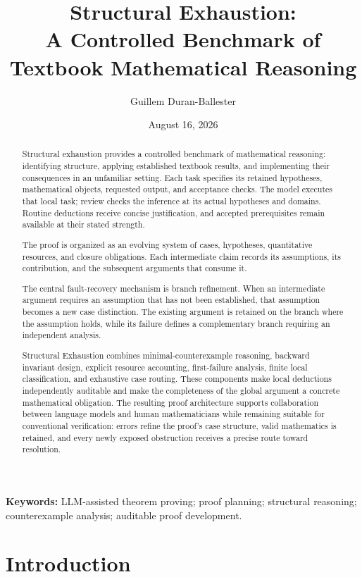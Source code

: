\documentclass[11pt]{article}
\title{Structural Exhaustion:\\
A Controlled Benchmark of Textbook Mathematical Reasoning}
\author{Guillem Duran-Ballester}
\date{August 16, 2026}
\begin{document}
\maketitle

\begin{abstract}
Structural exhaustion provides a controlled benchmark of mathematical
reasoning: identifying structure, applying established textbook results, and
implementing their consequences in an unfamiliar setting. Each task specifies
its retained hypotheses, mathematical objects, requested output, and acceptance
checks. The model executes that local task; review checks the inference at its
actual hypotheses and domains. Routine deductions receive concise justification,
and accepted prerequisites remain available at their stated strength.

The proof is organized as an evolving system of cases, hypotheses,
quantitative resources, and closure obligations. Each intermediate claim
records its assumptions, its contribution, and the subsequent arguments that
consume it.

The central fault-recovery mechanism is branch refinement. When an
intermediate argument requires an assumption that has not been established,
that assumption becomes a new case distinction. The existing argument is
retained on the branch where the assumption holds, while its failure defines a
complementary branch requiring an independent analysis.

Structural Exhaustion combines minimal-counterexample reasoning, backward
invariant design, explicit resource accounting, first-failure analysis, finite
local classification, and exhaustive case routing. These components make local
deductions independently auditable and make the completeness of the global
argument a concrete mathematical obligation. The resulting proof architecture
supports collaboration between language models and human mathematicians while
remaining suitable for conventional verification: errors refine the proof's
case structure, valid mathematics is retained, and every newly exposed
obstruction receives a precise route toward resolution.
\end{abstract}

\noindent\textbf{Keywords:} LLM-assisted theorem proving; proof planning;
structural reasoning; counterexample analysis; auditable proof development.

\section{Introduction}
\end{document}
